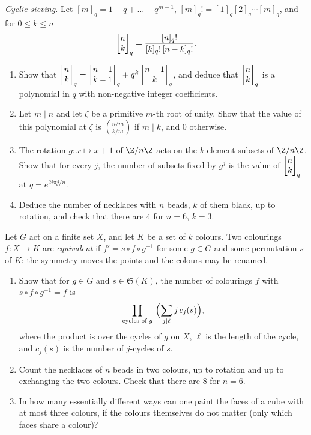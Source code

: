 \begin{exercise}[$\star\star\star$]\label{pb:sieving}
\emph{Cyclic sieving.} Let $[m]_q=1+q+\dots+q^{m-1}$, $[m]_q!=[1]_q[2]_q\cdots[m]_q$, and for $0\le k\le n$
\[
\begin{bmatrix}n\\k\end{bmatrix}_q=\frac{[n]_q!}{[k]_q!\,[n-k]_q!}.
\]
\begin{enumerate}[label=(\alph*)]
\item Show that $\begin{bmatrix}n\\k\end{bmatrix}_q=\begin{bmatrix}n-1\\k-1\end{bmatrix}_q+q^k\begin{bmatrix}n-1\\k\end{bmatrix}_q$, and deduce that $\begin{bmatrix}n\\k\end{bmatrix}_q$ is a polynomial in $q$ with
non-negative integer coefficients.
\item Let $m\mid n$ and let $\zeta$ be a primitive $m$-th root of unity. Show that the value of this polynomial at $\zeta$
is $\binom{n/m}{k/m}$ if $m\mid k$, and $0$ otherwise.
\item The rotation $g:x\mapsto x+1$ of $\Z/n\Z$ acts on the $k$-element subsets of $\Z/n\Z$. Show that for every $j$, the
number of subsets fixed by $g^j$ is the value of $\begin{bmatrix}n\\k\end{bmatrix}_q$ at $q=e^{2i\pi j/n}$.
\item Deduce the number of necklaces with $n$ beads, $k$ of them black, up to rotation, and check that there are $4$ for
$n=6$, $k=3$.
\end{enumerate}
\end{exercise}

\begin{exercise}[$\star\star$]\label{pb:patterns}
Let $G$ act on a finite set $X$, and let $K$ be a set of $k$ colours. Two colourings $f:X\to K$ are \emph{equivalent} if
$f'=s\circ f\circ g^{-1}$ for some $g\in G$ and some permutation $s$ of $K$: the symmetry moves the points and the colours may
be renamed.
\begin{enumerate}[label=(\alph*)]
\item Show that for $g\in G$ and $s\in\mathfrak S(K)$, the number of colourings $f$ with $s\circ f\circ g^{-1}=f$ is
\[
\prod_{\text{cycles of }g}\ \Bigl(\sum_{j\mid\ell}j\,c_j(s)\Bigr),
\]
where the product is over the cycles of $g$ on $X$, $\ell$ is the length of the cycle, and $c_j(s)$ is the number of $j$-cycles
of $s$.
\item Count the necklaces of $n$ beads in two colours, up to rotation and up to exchanging the two colours. Check that there
are $8$ for $n=6$.
\item In how many essentially different ways can one paint the faces of a cube with at most three colours, if the colours
themselves do not matter (only which faces share a colour)?
\end{enumerate}
\end{exercise}

